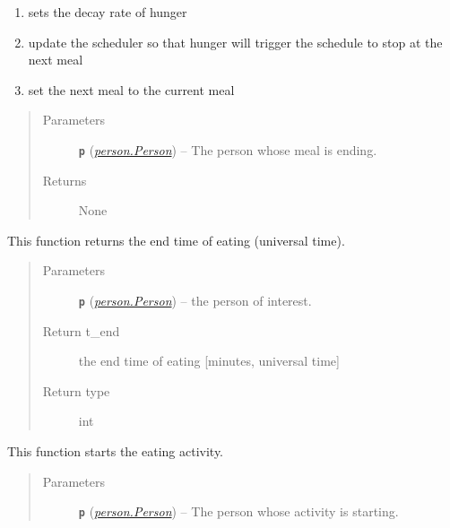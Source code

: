 \documentclass[letterpaper,10pt,english]{sphinxmanual}
\begin{document}
\begin{fulllineitems}
\begin{fulllineitems}
\begin{enumerate}
\item {} 
sets the decay rate of hunger

\item {} 
update the scheduler so that hunger will trigger the schedule to stop at the next meal

\item {} 
set the next meal to the current meal

\end{enumerate}
\begin{quote}\begin{description}
\item[{Parameters}] \leavevmode
\textbf{\texttt{p}} ({\hyperref[person:person.Person]{\emph{\emph{person.Person}}}}) -- The person whose meal is ending.

\item[{Returns}] \leavevmode
None

\end{description}\end{quote}

\end{fulllineitems}


\begin{fulllineitems}
\label{eat:eat.Eat.set_end_time}
This function returns the end time of eating (universal time).
\begin{quote}\begin{description}
\item[{Parameters}] \leavevmode
\textbf{\texttt{p}} ({\hyperref[person:person.Person]{\emph{\emph{person.Person}}}}) -- the person of interest.

\item[{Return t\_end}] \leavevmode
the end time of eating {[}minutes, universal time{]}

\item[{Return type}] \leavevmode
int

\end{description}\end{quote}

\end{fulllineitems}


\begin{fulllineitems}
\label{eat:eat.Eat.start}
This function starts the eating activity.
\begin{quote}\begin{description}
\item[{Parameters}] \leavevmode
\textbf{\texttt{p}} ({\hyperref[person:person.Person]{\emph{\emph{person.Person}}}}) -- The person whose activity is starting.


\end{description}
\end{quote}
\end{fulllineitems}
\end{fulllineitems}
\end{document}
